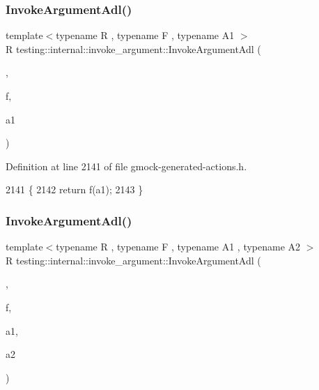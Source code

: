 \subsubsection{\texorpdfstring{Invoke\+Argument\+Adl()}{InvokeArgumentAdl()}\hspace{0.1cm}{\footnotesize\ttfamily [2/11]}}
{\footnotesize\ttfamily template$<$typename R , typename F , typename A1 $>$ \\
R testing\+::internal\+::invoke\+\_\+argument\+::\+Invoke\+Argument\+Adl (\begin{DoxyParamCaption}\item[{\hyperlink{structtesting_1_1internal_1_1invoke__argument_1_1AdlTag}{Adl\+Tag}}]{,  }\item[{F}]{f,  }\item[{A1}]{a1 }\end{DoxyParamCaption})}



Definition at line 2141 of file gmock-\/generated-\/actions.\+h.


\begin{DoxyCode}
2141                                         \{
2142   \textcolor{keywordflow}{return} f(a1);
2143 \}
\end{DoxyCode}
\mbox{\label{namespacetesting_1_1internal_1_1invoke__argument_afe4a6811c2bcd0c6c51194b95e224f73}} 
\subsubsection{\texorpdfstring{Invoke\+Argument\+Adl()}{InvokeArgumentAdl()}\hspace{0.1cm}{\footnotesize\ttfamily [3/11]}}
{\footnotesize\ttfamily template$<$typename R , typename F , typename A1 , typename A2 $>$ \\
R testing\+::internal\+::invoke\+\_\+argument\+::\+Invoke\+Argument\+Adl (\begin{DoxyParamCaption}\item[{\hyperlink{structtesting_1_1internal_1_1invoke__argument_1_1AdlTag}{Adl\+Tag}}]{,  }\item[{F}]{f,  }\item[{A1}]{a1,  }\item[{A2}]{a2 }\end{DoxyParamCaption})}



